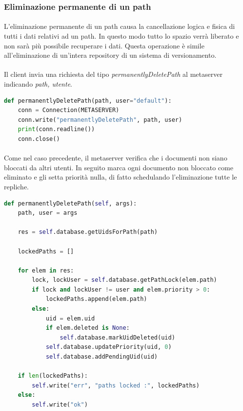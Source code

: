 \documentclass[11pt,a4paper,english]{article}
\begin{document}
\subsubsection{Eliminazione permanente di un path}

\paragraph{} L'eliminazione permanente di un path causa la cancellazione logica e fisica di tutti i dati relativi ad un path. In questo modo tutto lo spazio verrà liberato e non sarà più possibile recuperare i dati. Questa operazione è simile all'eliminazione di un'intera repository di un sistema di versionamento. 

\paragraph{} Il client invia una richiesta del tipo \emph{permanentlyDeletePath} al metaserver indicando \emph{path, utente}.

\begin{lstlisting}[language=Python, title=Codice]
def permanentlyDeletePath(path, user="default"):
    conn = Connection(METASERVER)
    conn.write("permanentlyDeletePath", path, user)
    print(conn.readline())
    conn.close()
\end{lstlisting}

\paragraph{} Come nel caso precedente, il metaserver verifica che i documenti non siano bloccati da altri utenti. In seguito marca ogni documento non bloccato come eliminato e gli setta priorità nulla, di fatto schedulando l'eliminazione tutte le repliche.

\begin{lstlisting}[language=Python, title=Codice]
def permanentlyDeletePath(self, args):
    path, user = args

    res = self.database.getUidsForPath(path)

    lockedPaths = []

    for elem in res:
        lock, lockUser = self.database.getPathLock(elem.path)
        if lock and lockUser != user and elem.priority > 0:
            lockedPaths.append(elem.path)
        else:
            uid = elem.uid
            if elem.deleted is None:
                self.database.markUidDeleted(uid)
            self.database.updatePriority(uid, 0)
            self.database.addPendingUid(uid)

    if len(lockedPaths):
        self.write("err", "paths locked :", lockedPaths)
    else:
        self.write("ok")
\end{lstlisting}
\end{document}
